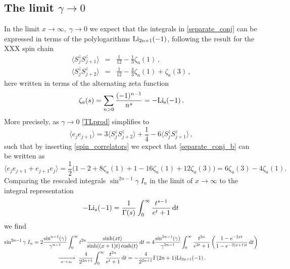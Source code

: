 \documentclass[a4paper,10pt]{article}
\newcommand{\linnea}[1]{$\framebox{\tiny L}$\ \textbf{\texttt{{\color{red}\footnotesize#1}}}}
\begin{document}
\subsection{The limit $\gamma \to 0$}\label{gamma_zero_check}
In the limit $x\to \infty,\; \gamma\to 0$ we expect that the integrals in \eqref{separate_conj} can be expressed in terms of the polylogarithms $\rm{Li}_{2n+1}(-1)$, following the result for the XXX spin chain \cite{Takahashi}
\begin{subequations}\label{spin_correlators}
\begin{eqnarray}
\langle S^z_j S^z_{j+1} \rangle &=& \frac{1}{12} - \frac{1}{3} \zeta_a(1) \,,\\
\langle S^z_j S^z_{j+2} \rangle &=& \frac{1}{12} - \frac{4}{3} \zeta_a(1) + \zeta_a(3) \, ,
\end{eqnarray}
\end{subequations}
here written in terms of the alternating zeta function
\begin{equation}
\zeta_a(s) = \sum_{n>0} \frac{(-1)^{n-1}}{n^s} = -\rm{Li}_s(-1) \,.
\end{equation}
%
More precisely, as $\gamma \to 0$ \eqref{TLprod} simplifies to
\begin{equation}
\langle e_je_{j+1} \rangle = 3 \langle S_j^z S_{j+2}^z\rangle  + \frac{1}{4} - 6 \langle S_j^z S_{j+1}^z\rangle \,,
\end{equation}
such that by inserting \eqref{spin_correlators} we expect that \eqref{separate_conj_b} can be written as
\begin{equation}\label{spin_correl_result}
\langle e_je_{j+1} + e_{j+1}e_j \rangle = 
\frac{1}{2}\big(1-2 + 8\zeta_a(1) + 1- 16\zeta_a(1) + 12 \zeta_a(3)\big)
= 6 \zeta_a(3) - 4 \zeta_a(1).
\end{equation}
Comparing the rescaled integrals $\sin^{2n-1}\gamma \; I_n$ in the limit of $x\to\infty$ to the integral representation
\begin{equation}
-{\rm Li}_s(-1) = \frac{1}{\Gamma(s)} \int_0^\infty \frac{t^{s-1}}{e^t+1} \, {\rm d}t \,
\end{equation}
we find
\begin{multline}
\sin^{2n-1}\gamma \; I_n   %
= 2 \frac{\sin^{n-1}(\gamma) }{\gamma^{n-1}} \int_0^{\infty} t^{2n}  \frac{\sinh(xt)}{\sinh((x+1)t)\cosh(t)} \, {\rm d}t 
%
= 4 \frac{\sin^{2n-1}(\gamma) }{\gamma^{2n-1}} \int_0^{\infty} \frac{t^{2n}}{e^{2t} +1} \left( \frac{1-e^{-2xt}}{1-e^{-2(x+1)t}} \, {\rm d}t \right)\\
\;   \xrightarrow[\; x\to\infty\;]{} \;  \frac{4}{2^{2n +1 }} \int_0^\infty \frac{t^{2n}}{e^{t} +1} \, {\rm d}t
%
%
 = -  \frac{4}{2^{2n +1 }}  \Gamma(2n+1) \rm{Li}_{2n+1}(-1) \,.
\end{multline}
\end{document}
